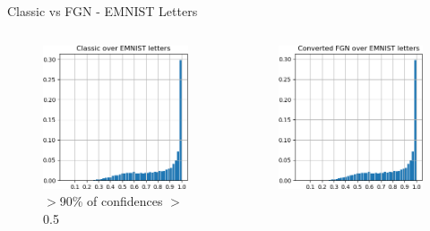 \documentclass{beamer}
\begin{document}
\begin{frame}{Classic vs FGN - EMNIST Letters }
 \vspace{-3mm}
    \begin{columns}
    \begin{column}{.33\textwidth}
    \begin{figure}
        \includegraphics[width=.85\textwidth]{images/mnist-behavior/classic-hist-emnist.png}\\
        \centering \tiny{$>$90\% of confidences $>$0.5}
    \end{figure}
    \end{column}
    \begin{column}{.33\textwidth}
    \begin{figure}
        \includegraphics[width=.85\textwidth]{images/mnist-behavior/converted-hist-emnist.png}\\

\end{figure}
\end{column}
\end{columns}
\end{frame}
\end{document}
